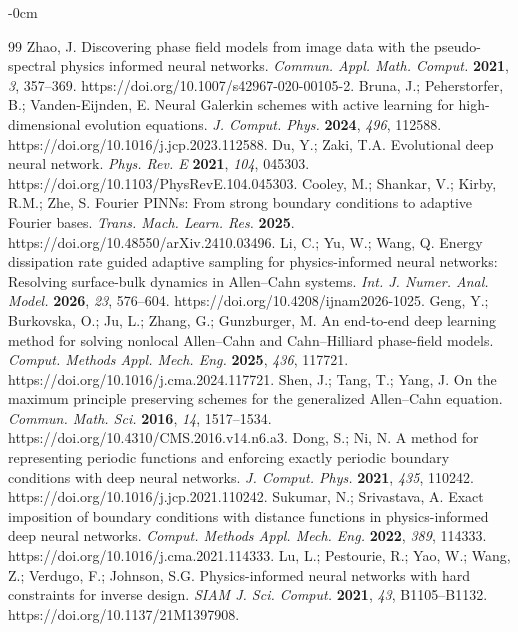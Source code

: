 \begin{adjustwidth}{-\extralength}{0cm}
\begin{thebibliography}{99}
 Zhao, J. Discovering phase field models from image data with the pseudo-spectral physics informed neural networks. \textit{Commun. Appl. Math. Comput.} \textbf{2021}, \textit{3}, 357--369. https://doi.org/10.1007/s42967-020-00105-2.
 Bruna, J.; Peherstorfer, B.; Vanden-Eijnden, E. Neural Galerkin schemes with active learning for high-dimensional evolution equations. \textit{J. Comput. Phys.} \textbf{2024}, \textit{496}, 112588. https://doi.org/10.1016/j.jcp.2023.112588.
 Du, Y.; Zaki, T.A. Evolutional deep neural network. \textit{Phys. Rev. E} \textbf{2021}, \textit{104}, 045303. https://doi.org/10.1103/PhysRevE.104.045303.
 Cooley, M.; Shankar, V.; Kirby, R.M.; Zhe, S. Fourier PINNs: From strong boundary conditions to adaptive Fourier bases. \textit{Trans. Mach. Learn. Res.} \textbf{2025}. https://doi.org/10.48550/arXiv.2410.03496.
 Li, C.; Yu, W.; Wang, Q. Energy dissipation rate guided adaptive sampling for physics-informed neural networks: Resolving surface-bulk dynamics in Allen--Cahn systems. \textit{Int. J. Numer. Anal. Model.} \textbf{2026}, \textit{23}, 576--604. https://doi.org/10.4208/ijnam2026-1025.
 Geng, Y.; Burkovska, O.; Ju, L.; Zhang, G.; Gunzburger, M. An end-to-end deep learning method for solving nonlocal Allen--Cahn and Cahn--Hilliard phase-field models. \textit{Comput. Methods Appl. Mech. Eng.} \textbf{2025}, \textit{436}, 117721. https://doi.org/10.1016/j.cma.2024.117721.
 Shen, J.; Tang, T.; Yang, J. On the maximum principle preserving schemes for the generalized Allen--Cahn equation. \textit{Commun. Math. Sci.} \textbf{2016}, \textit{14}, 1517--1534. https://doi.org/10.4310/CMS.2016.v14.n6.a3.
 Dong, S.; Ni, N. A method for representing periodic functions and enforcing exactly periodic boundary conditions with deep neural networks. \textit{J. Comput. Phys.} \textbf{2021}, \textit{435}, 110242. https://doi.org/10.1016/j.jcp.2021.110242.
 Sukumar, N.; Srivastava, A. Exact imposition of boundary conditions with distance functions in physics-informed deep neural networks. \textit{Comput. Methods Appl. Mech. Eng.} \textbf{2022}, \textit{389}, 114333. https://doi.org/10.1016/j.cma.2021.114333.
 Lu, L.; Pestourie, R.; Yao, W.; Wang, Z.; Verdugo, F.; Johnson, S.G. Physics-informed neural networks with hard constraints for inverse design. \textit{SIAM J. Sci. Comput.} \textbf{2021}, \textit{43}, B1105--B1132. https://doi.org/10.1137/21M1397908.

\end{thebibliography}
\end{adjustwidth}
